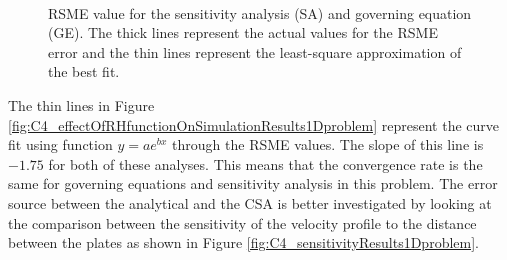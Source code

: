 \begin{figure}[H]
    \centering
    \\
    \caption{RSME value for the sensitivity analysis (SA) and governing equation (GE). The thick lines represent the actual values for the RSME error and the thin lines represent the least-square approximation of the best fit.}
    \label{fig:C4_effectOfNumberOfNodesOnSensitivityResults1Dproblem}
\end{figure}

The thin lines in Figure \ref{fig:C4_effectOfRHfunctionOnSimulationResults1Dproblem} represent the curve fit using function $y = ae^{bx}$ through the RSME values. The slope of this line is $-1.75$ for both of these analyses. This means that the convergence rate is the same for governing equations and sensitivity analysis in this problem. The error source between the analytical and the CSA is better investigated by looking at the comparison between the sensitivity of the velocity profile to the distance between the plates as shown in Figure \ref{fig:C4_sensitivityResults1Dproblem}.

